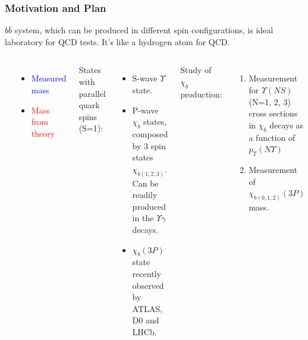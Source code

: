 \documentclass{beamer}
\begin{document}
\begin{frame}
\frametitle{Motivation and Plan}
$b\bar{b}$ system, which can be produced in different spin configurations, is ideal laboratory for QCD tests. It's like a hydrogen atom for QCD.
\begin{columns}[c]
\includegraphics[width=\textwidth]{images/bfamily.png}
\begin{itemize}
  \item \textcolor{blue}{Measured mass}
  \item \textcolor{red}{Mass from theory}
\end{itemize}
States with parallel quark spins (S=1):
\begin{itemize}
  \item S-wave $\Upsilon$ state.
  \item P-wave $\chi_{b}$ states, composed by 3 spin states $\chi_{b(1,2,3)}$. Can be readily produced in the $\Upsilon \gamma$ decays.
  \item $\chi_{b}(3P)$ state recently observed by ATLAS, D0 and LHCb.
\end{itemize}
Study of $\chi_{b}$ production:
\begin{enumerate}
  \item Measurement for $\Upsilon(NS)$ (N=1, 2, 3) cross sections in $\chi_b$ decays as a function of $p_T(N\Upsilon)$
  \item Measurement of $\chi_{b(0,1,2)}(3P)$ mass.
\end{enumerate}
\end{columns}
\end{frame}
\end{document}
